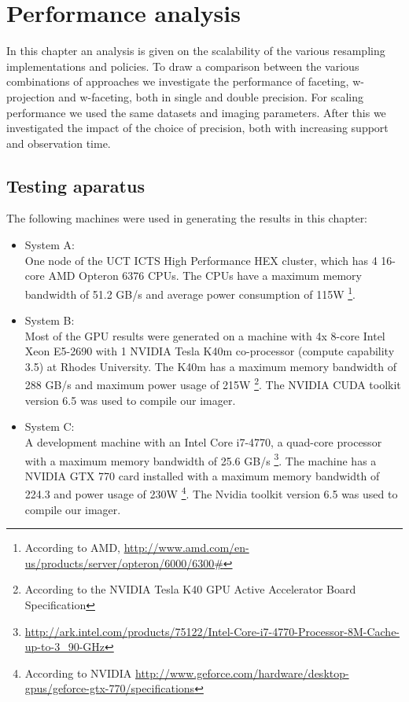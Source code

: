 \chapter{Performance analysis}
In this chapter an analysis is given on the scalability of the various resampling implementations and policies. To draw a comparison between the various combinations
of approaches we investigate the performance of faceting, w-projection and w-faceting, both in single and double precision. For scaling performance we used the 
same datasets and imaging parameters. After this we investigated the impact of the choice of precision, both with increasing support and observation time.

\section{Testing aparatus}
The following machines were used in generating the results in this chapter:
\begin{itemize}
 \item System A:\\
 One node of the UCT ICTS High Performance HEX cluster, which has 4 16-core AMD Opteron 6376 CPUs. The CPUs have a maximum memory bandwidth of 
 51.2 GB/s and average power consumption of 115W \footnote{According to AMD, \url{http://www.amd.com/en-us/products/server/opteron/6000/6300\#}}.
 \item System B:\\
 Most of the GPU results were generated on a machine with 4x 8-core Intel Xeon E5-2690 with 1 NVIDIA Tesla K40m co-processor (compute capability 3.5) at Rhodes University. The K40m has a maximum
 memory bandwidth of 288 GB/s and maximum power usage of 215W \footnote{According to the NVIDIA Tesla K40 GPU Active Accelerator Board Specification}. The NVIDIA CUDA toolkit 
 version 6.5 was used to compile our imager. 
 \item System C:\\
 A development machine with an Intel Core i7-4770, a quad-core processor with a maximum memory bandwidth of 25.6 GB/s \footnote{\url{http://ark.intel.com/products/75122/Intel-Core-i7-4770-Processor-8M-Cache-up-to-3_90-GHz}}. 
 The machine has a NVIDIA GTX 770 card installed with a maximum memory bandwidth of 224.3 and power usage of 
 230W \footnote{According to NVIDIA \url{http://www.geforce.com/hardware/desktop-gpus/geforce-gtx-770/specifications}}. The Nvidia toolkit version 6.5 was used to compile our imager.
\end{itemize}

